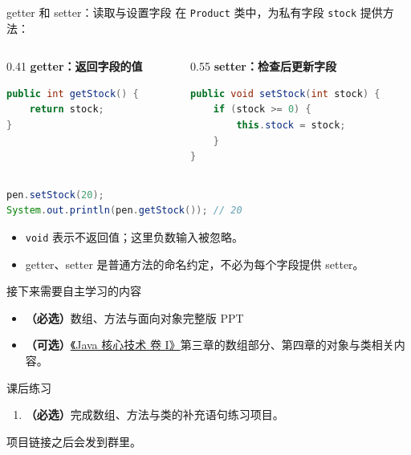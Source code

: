 \documentclass[aspectratio=169]{beamer}
\begin{document}
\begin{frame}[fragile]{getter 和 setter：读取与设置字段}
  在 \texttt{Product} 类中，为私有字段 \texttt{stock} 提供方法：
  \begin{columns}[T,onlytextwidth]
    \begin{column}{0.41\textwidth}
      \textbf{getter：返回字段的值}
      \begin{lstlisting}[language=Java]
public int getStock() {
    return stock;
}
      \end{lstlisting}
    \end{column}
    \begin{column}{0.55\textwidth}
      \textbf{setter：检查后更新字段}
      \begin{lstlisting}[language=Java]
public void setStock(int stock) {
    if (stock >= 0) {
        this.stock = stock;
    }
}
      \end{lstlisting}
    \end{column}
  \end{columns}
  \begin{lstlisting}[language=Java]
pen.setStock(20);
System.out.println(pen.getStock()); // 20
  \end{lstlisting}
  \begin{itemize}
    \item \texttt{void} 表示不返回值；这里负数输入被忽略。
    \item getter、setter 是普通方法的命名约定，不必为每个字段提供 setter。
  \end{itemize}
\end{frame}

\begin{frame}{接下来需要自主学习的内容}
  \begin{itemize}
    \item \textbf{（必选）}数组、方法与面向对象完整版 PPT
      \bigskip
    \item \textbf{（可选）}\href{https://www.informit.com/store/core-java-volumei-fundamentals-9780135558607}{《Java 核心技术 卷 I》}第三章的数组部分、第四章的对象与类相关内容。
  \end{itemize}
\end{frame}

\begin{frame}{课后练习}
  \begin{enumerate}
    \item \textbf{（必选）}完成数组、方法与类的补充语句练习项目。
  \end{enumerate}
  \bigskip
  项目链接之后会发到群里。
\end{frame}
\end{document}
